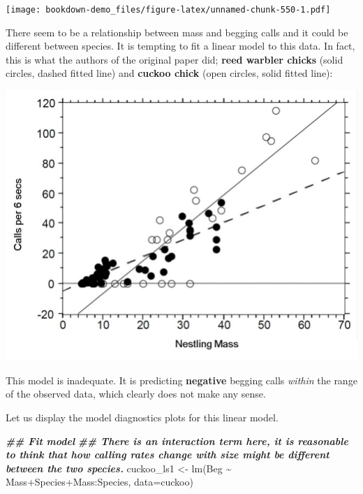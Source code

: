 \documentclass[
]{book}
\newenvironment{Shaded}{\begin{snugshade}}{\end{snugshade}}
\newcommand{\AttributeTok}[1]{\textcolor[rgb]{0.77,0.63,0.00}{#1}}
\newcommand{\DocumentationTok}[1]{\textcolor[rgb]{0.56,0.35,0.01}{\textbf{\textit{#1}}}}
\newcommand{\FunctionTok}[1]{\textcolor[rgb]{0.00,0.00,0.00}{#1}}
\newcommand{\NormalTok}[1]{#1}
\newcommand{\OtherTok}[1]{\textcolor[rgb]{0.56,0.35,0.01}{#1}}
\newcommand{\SpecialCharTok}[1]{\textcolor[rgb]{0.00,0.00,0.00}{#1}}
\begin{document}
\texttt{[image: bookdown-demo\_files/figure-latex/unnamed-chunk-550-1.pdf]}

There seem to be a relationship between mass and begging calls and it could
be different between species. It is tempting to fit a linear model to this data.
In fact, this is what the authors
of the original paper did; \textbf{reed warbler chicks} (solid circles, dashed fitted line) and
\textbf{cuckoo chick} (open circles, solid fitted line):

\includegraphics[width=14.03in]{images/original}

This model is inadequate. It is predicting \textbf{negative} begging calls \emph{within} the
range of the observed data, which clearly does not make any sense.

Let us display the model diagnostics plots for this linear model.

\begin{Shaded}
\begin{Highlighting}[]
\DocumentationTok{\#\# Fit model}
\DocumentationTok{\#\# There is an interaction term here, it is reasonable to think that how calling rates change with size might be different between the two species.}
\NormalTok{cuckoo\_ls1 }\OtherTok{\textless{}{-}} \FunctionTok{lm}\NormalTok{(Beg }\SpecialCharTok{\textasciitilde{}}\NormalTok{ Mass}\SpecialCharTok{+}\NormalTok{Species}\SpecialCharTok{+}\NormalTok{Mass}\SpecialCharTok{:}\NormalTok{Species, }\AttributeTok{data=}\NormalTok{cuckoo) }
\end{Highlighting}
\end{Shaded}
\end{document}
